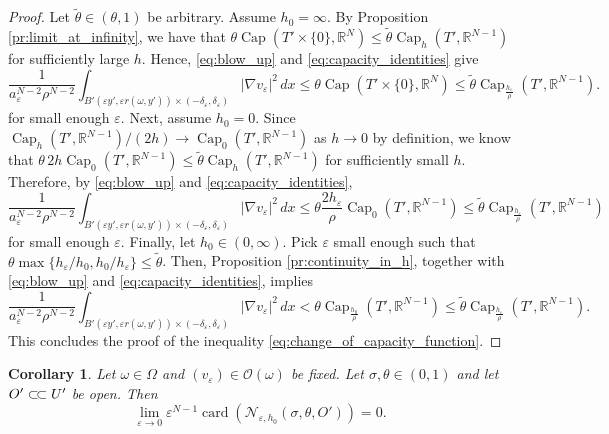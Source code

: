 \documentclass{article}
\numberwithin{equation}{section}
\newtheorem{corollary}[theorem]{Corollary}
\theoremstyle{definition}
\theoremstyle{remark}
\newcommand{\card}{\operatorname{card}}
\newcommand{\cpct}{\operatorname{Cap}}
\newcommand{\csubset}{\subset\joinrel\subset}
\begin{document}
\begin{proof}
    Let $\tilde{\theta} \in (\theta, 1)$  be arbitrary. Assume $h_0 = \infty$. By Proposition \ref{pr:limit_at_infinity}, we have that $\theta \cpct(T' \times \{0\}, \mathbb{R}^N) \le \tilde{\theta} \cpct_h(T', \mathbb{R}^{N - 1})$ for sufficiently large $h$. Hence, \eqref{eq:blow_up} and \eqref{eq:capacity_identities} give
    \begin{equation*}
        \frac{1}{a_\varepsilon^{N - 2} \rho^{N - 2}} \int_{B'(\varepsilon y', \varepsilon r(\omega, y')) \times (-\delta_\varepsilon, \delta_\varepsilon)} |\nabla v_\varepsilon|^2 \, dx \le \theta \cpct(T' \times \{0\}, \mathbb{R}^N) \le \tilde{\theta} \cpct_{\frac{h_\varepsilon}{\rho}}(T', \mathbb{R}^{N - 1}).
    \end{equation*}
    for small enough $\varepsilon$. Next, assume $h_0 = 0$. Since $\cpct_h(T', \mathbb{R}^{N - 1})/(2h) \to \cpct_0(T', \mathbb{R}^{N - 1})$ as $h \to 0$ by definition, we know that $\theta \, 2h \cpct_0(T', \mathbb{R}^{N - 1}) \le \tilde{\theta} \cpct_h(T', \mathbb{R}^{N - 1})$ for sufficiently small $h$. Therefore, by \eqref{eq:blow_up} and \eqref{eq:capacity_identities},
    \begin{equation*}
        \frac{1}{a_\varepsilon^{N - 2} \rho^{N - 2}} \int_{B'(\varepsilon y', \varepsilon r(\omega, y')) \times (-\delta_\varepsilon, \delta_\varepsilon)} |\nabla v_\varepsilon|^2 \, dx \le \theta \frac{2h_\varepsilon}{\rho} \cpct_0(T', \mathbb{R}^{N - 1}) \le \tilde{\theta} \cpct_{\frac{h_\varepsilon}{\rho}}(T', \mathbb{R}^{N - 1})
    \end{equation*}
    for small enough $\varepsilon$. Finally, let $h_0 \in (0, \infty)$. Pick $\varepsilon$ small enough such that $\theta \max \{h_\varepsilon/h_0, h_0/h_\varepsilon\} \le \tilde{\theta}$. Then, Proposition \ref{pr:continuity_in_h}, together with \eqref{eq:blow_up} and \eqref{eq:capacity_identities}, implies
    \begin{equation*}
        \frac{1}{a_\varepsilon^{N - 2} \rho^{N - 2}} \int_{B'(\varepsilon y', \varepsilon r(\omega, y')) \times (-\delta_\varepsilon, \delta_\varepsilon)} |\nabla v_\varepsilon|^2 \, dx < \theta \cpct_{\frac{h_0}{\rho}}(T', \mathbb{R}^{N - 1}) \le \tilde{\theta} \cpct_\frac{h_\varepsilon}{\rho}(T', \mathbb{R}^{N - 1}).
    \end{equation*}
    This concludes the proof of the inequality \eqref{eq:change_of_capacity_function}.
\end{proof}

\begin{corollary} \label{co:counting_bad_points}
    Let $\omega \in \Omega$ and $(v_\varepsilon) \in \mathcal{O}(\omega)$ be fixed. Let $\sigma, \theta \in (0, 1)$ and let $O' \csubset U'$ be open. Then
    \[
    \lim_{\varepsilon \to 0} \varepsilon^{N - 1} \card\left(\mathcal{N}_{\varepsilon, h_0}(\sigma, \theta, O')\right) = 0.
    \]
\end{corollary}
\end{document}
